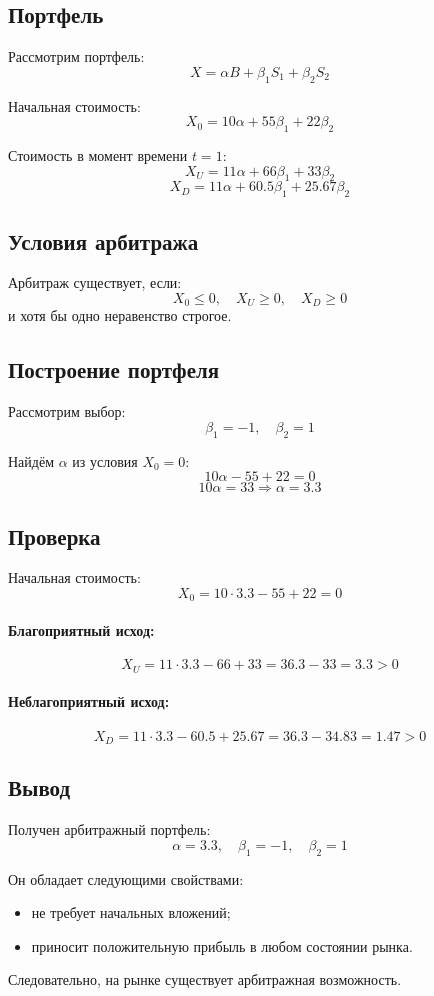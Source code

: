 \subsection*{Портфель}

Рассмотрим портфель:
\[
X = \alpha B + \beta_1 S_1 + \beta_2 S_2
\]

Начальная стоимость:
\[
X_0 = 10\alpha + 55\beta_1 + 22\beta_2
\]

Стоимость в момент времени $t=1$:
\[
X_U = 11\alpha + 66\beta_1 + 33\beta_2
\]
\[
X_D = 11\alpha + 60.5\beta_1 + 25.67\beta_2
\]

\subsection*{Условия арбитража}

Арбитраж существует, если:
\[
X_0 \le 0, \quad X_U \ge 0, \quad X_D \ge 0
\]
и хотя бы одно неравенство строгое.

\subsection*{Построение портфеля}

Рассмотрим выбор:
\[
\beta_1 = -1, \quad \beta_2 = 1
\]

Найдём $\alpha$ из условия $X_0 = 0$:
\[
10\alpha - 55 + 22 = 0
\]
\[
10\alpha = 33 \Rightarrow \alpha = 3.3
\]

\subsection*{Проверка}

Начальная стоимость:
\[
X_0 = 10 \cdot 3.3 - 55 + 22 = 0
\]

\paragraph{Благоприятный исход:}
\[
X_U = 11 \cdot 3.3 - 66 + 33 = 36.3 - 33 = 3.3 > 0
\]

\paragraph{Неблагоприятный исход:}
\[
X_D = 11 \cdot 3.3 - 60.5 + 25.67 = 36.3 - 34.83 = 1.47 > 0
\]

\subsection*{Вывод}

Получен арбитражный портфель:
\[
\alpha = 3.3, \quad \beta_1 = -1, \quad \beta_2 = 1
\]

Он обладает следующими свойствами:
\begin{itemize}
    \item не требует начальных вложений;
    \item приносит положительную прибыль в любом состоянии рынка.
\end{itemize}

Следовательно, на рынке существует арбитражная возможность.
